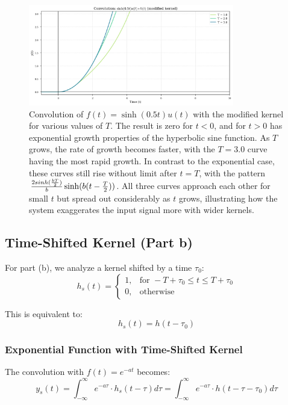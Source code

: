 	\begin{figure}[htbp]
		\centering
		\includegraphics[width=0.8\textwidth]{figs/hyper_modified_convolution.png}
		\caption{Convolution of $f(t) = \sinh(0.5t)u(t)$ with the modified kernel for various values of $T$. The result is zero for $t < 0$, and for $t > 0$ has exponential growth properties of the hyperbolic sine function. As $T$ grows, the rate of growth becomes faster, with the $T = 3.0$ curve having the most rapid growth. In contrast to the exponential case, these curves still rise without limit after $t = T$, with the pattern $\frac{2\\sinh(\frac{bT}{2})}{b}\sinh(b(t-\frac{T}{2}))$. All three curves approach each other for small $t$ but spread out considerably as $t$ grows, illustrating how the system exaggerates the input signal more with wider kernels.}
		\label{fig:hyper_modified_convolution}
	\end{figure}
	
	\subsection{Time-Shifted Kernel (Part b)}
	For part (b), we analyze a kernel shifted by a time $\tau_0$:
	\begin{equation}
		h_s(t) = 
		\begin{cases} 
			1, & \text{for } -T+\tau_0 \leq t \leq T+\tau_0 \\
			0, & \text{otherwise}
		\end{cases}
	\end{equation}
	
	This is equivalent to:
	\begin{equation}
		h_s(t) = h(t-\tau_0)
	\end{equation}
	
	\subsubsection{Exponential Function with Time-Shifted Kernel}
	The convolution with $f(t) = e^{-at}$ becomes:
	\begin{equation}
		y_s(t) = \int_{-\infty}^{\infty} e^{-a\tau} \cdot h_s(t - \tau) d\tau = \int_{-\infty}^{\infty} e^{-a\tau} \cdot h(t - \tau - \tau_0) d\tau
	\end{equation}
	
